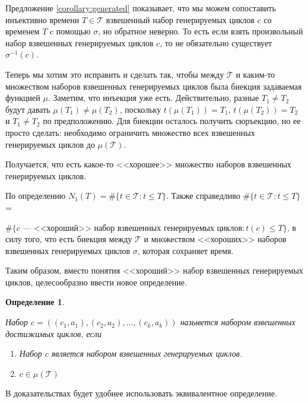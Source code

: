\documentclass{article}
\makeatletter
\let\@msm@th@eqref\eqref
\renewcommand{\eqref}[1]{%
  \begingroup
  \leavevmode
  \color{violet}%
  \hypersetup{linkbordercolor=[named]{violet}}%
  \@msm@th@eqref{#1}%
  \endgroup
}
\newtheorem{definition}{Определение}
\makeatother
\begin{document}
Предложение \eqref{corollary:generated} показывает, что мы можем сопоставить инъективно времени $T \in \mathcal{T}$ взвешенный набор генерируемых циклов $c$ со временем $T$ c помощью $\sigma$, но обратное неверно. То есть если взять произвольный набор взвешенных генерируемых циклов $c$, то не обязательно существует $\sigma^{-1}(c)$. 

Теперь мы хотим это исправить и сделать так, чтобы между $\mathcal{T}$ и каким-то множеством наборов взвешенных генерируемых циклов была биекция задаваемая функцией $\mu$. Заметим, что инъекция уже есть. Действительно, разные $T_{1} \neq T_{2}$ будут давать $\mu(T_{1}) \neq \mu(T_{2})$, поскольку 
$t(\mu(T_{1})) = T_{1}$, $t(\mu(T_{2})) = T_{2}$ и $T_{1} \neq T_{2}$ по предположению.  Для биекции осталось получить сюръекцию, но ее просто сделать: необходимо ограничить множество всех взвешенных генерируемых циклов до $\mu(\mathcal{T})$.

Получается, что есть какое-то <<хорошее>> множество наборов взвешенных генерируемых циклов. 

По определению $N_{1}(T) = \#\{t \in \mathcal{T}: t \leq T\}$. 
Также справедливо
$\#\{t \in \mathcal{T}: t \leq T\}$ = 

\noindent
$\#\{c \text{ --- <<хороший>> набор взвешенных генерируемых циклов}: t(c) \leq T\}$, в силу того, что есть биекция между $\mathcal{T}$ и множеством <<хороших>> наборов взвешенных генерируемых циклов $\sigma$, которая сохраняет
время.

Таким образом, вместо понятия <<хороший>> набор взвешенных генерируемых циклов, целесообразно ввести новое определение.

\begin{definition} $ $
    \label{def:reachable_weighted_simple}
    
    Набор $c = ((c_{1}, a_{1}), (c_{2}, a_{2}), \ldots, (c_{k}, a_{k}))$ назывется набором взвешенных достижимых циклов, если
    \begin{enumerate}
         \item Набор $c$ является набором взвешенных генерируемых циклов.
         \item $c \in \mu(\mathcal{T})$  
    \end{enumerate}
\end{definition}

В доказательствах будет удобнее использовать эквивалентное определение.
\end{document}
